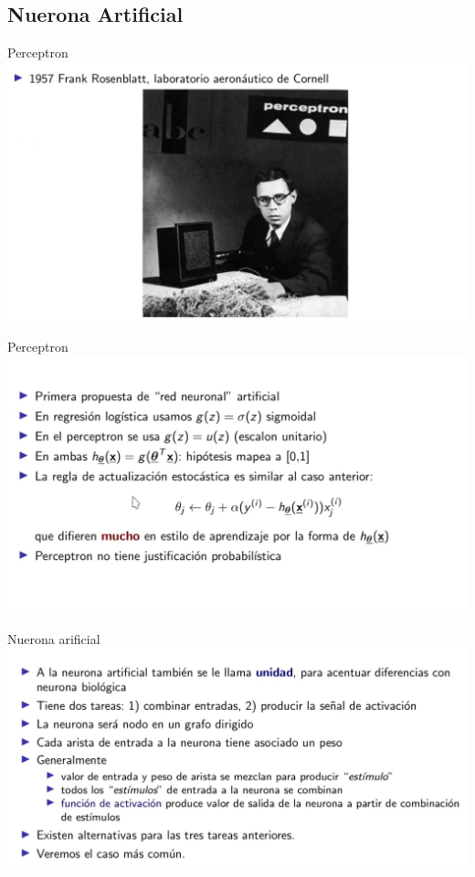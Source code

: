 \documentclass[8pt]{beamer}  %
\begin{document}
\subsection{Nuerona Artificial}
\begin{frame}{Perceptron }
	\includegraphics[width=\textwidth]{im4}
\end{frame}
\begin{frame}{Perceptron }
	\includegraphics[width=\textwidth]{im5}
\end{frame}
\begin{frame}{Nuerona arificial}
	\includegraphics[width=\textwidth]{im6}
\end{frame}
\end{document}
